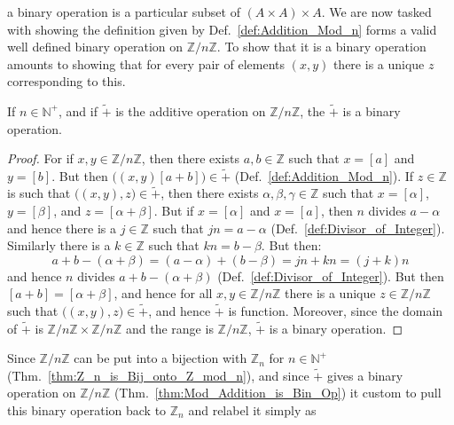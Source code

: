     a binary operation is a particular subset of
    $(A\times{A})\times{A}$. We are now tasked with showing the
    definition given by Def.~\ref{def:Addition_Mod_n} forms a valid well
    defined binary operation on $\mathbb{Z}/n\mathbb{Z}$. To show that
    it is a binary operation amounts to showing that for every pair of
    elements $(x,y)$ there is a unique $z$ corresponding to this.
    \begin{theorem}
        \label{thm:Mod_Addition_is_Bin_Op}%
        If $n\in\mathbb{N}^{+}$, and if $\tilde{+}$ is the additive
        operation on $\mathbb{Z}/n\mathbb{Z}$, the $\tilde{+}$ is a
        binary operation.
    \end{theorem}
    \begin{proof}
        For if $x,y\in\mathbb{Z}/n\mathbb{Z}$, then there exists
        $a,b\in\mathbb{Z}$ such that $x=[a]$ and $y=[b]$. But then
        $\big((x,y)[a+b]\big)\in\tilde{+}$
        (Def.~\ref{def:Addition_Mod_n}). If $z\in\mathbb{Z}$ is such
        that $\big((x,y),z\big)\in\tilde{+}$, then there exists
        $\alpha,\beta,\gamma\in\mathbb{Z}$ such that
        $x=[\alpha]$, $y=[\beta]$, and $z=[\alpha+\beta]$. But if
        $x=[\alpha]$ and $x=[a]$, then $n$ divides $a-\alpha$ and hence
        there is a $j\in\mathbb{Z}$ such that $jn=a-\alpha$
        (Def.~\ref{def:Divisor_of_Integer}). Similarly there is a
        $k\in\mathbb{Z}$ such that $kn=b-\beta$. But then:
        \begin{equation}
            a+b-(\alpha+\beta)=(a-\alpha)+(b-\beta)=jn+kn=(j+k)n
        \end{equation}
        and hence $n$ divides $a+b-(\alpha+\beta)$
        (Def.~\ref{def:Divisor_of_Integer}). But then
        $[a+b]=[\alpha+\beta]$, and hence for all
        $x,y\in\mathbb{Z}/n\mathbb{Z}$ there is a unique
        $z\in\mathbb{Z}/n\mathbb{Z}$ such that
        $\big((x,y),z\big)\in\tilde{+}$, and hence $\tilde{+}$ is
        function. Moreover, since the domain of $\tilde{+}$ is
        $\mathbb{Z}/n\mathbb{Z}\times\mathbb{Z}/n\mathbb{Z}$ and the
        range is $\mathbb{Z}/n\mathbb{Z}$, $\tilde{+}$ is a binary
        operation.
    \end{proof}
    Since $\mathbb{Z}/n\mathbb{Z}$ can be put into a bijection with
    $\mathbb{Z}_{n}$ for $n\in\mathbb{N}^{+}$
    (Thm.~\ref{thm:Z_n_is_Bij_onto_Z_mod_n}), and since $\tilde{+}$
    gives a binary operation on $\mathbb{Z}/n\mathbb{Z}$
    (Thm.~\ref{thm:Mod_Addition_is_Bin_Op}) it custom to pull this
    binary operation back to $\mathbb{Z}_{n}$ and relabel it simply as
